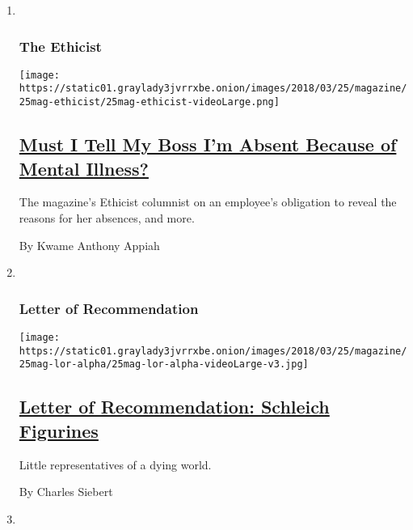 \begin{enumerate}
\def\labelenumi{\arabic{enumi}.}
\item ~
  \hypertarget{the-ethicist}{%
  \subsubsection{The Ethicist}\label{the-ethicist}}

  \texttt{[image: https://static01.graylady3jvrrxbe.onion/images/2018/03/25/magazine/25mag-ethicist/25mag-ethicist-videoLarge.png]}

  \hypertarget{must-i-tell-my-boss-im-absent-because-of-mental-illness}{%
  \subsection{\texorpdfstring{\href{/2018/03/20/magazine/must-i-tell-my-boss-im-absent-because-of-mental-illness.html}{Must
  I Tell My Boss I'm Absent Because of Mental
  Illness?}}{Must I Tell My Boss I'm Absent Because of Mental Illness?}}\label{must-i-tell-my-boss-im-absent-because-of-mental-illness}}

  The magazine's Ethicist columnist on an employee's obligation to
  reveal the reasons for her absences, and more.

  By Kwame Anthony Appiah
\item ~
  \hypertarget{letter-of-recommendation}{%
  \subsubsection{Letter of
  Recommendation}\label{letter-of-recommendation}}

  \texttt{[image: https://static01.graylady3jvrrxbe.onion/images/2018/03/25/magazine/25mag-lor-alpha/25mag-lor-alpha-videoLarge-v3.jpg]}

  \hypertarget{letter-of-recommendation-schleich-figurines}{%
  \subsection{\texorpdfstring{\href{/2018/03/20/magazine/letter-of-recommendation-schleich-figurines.html}{Letter
  of Recommendation: Schleich
  Figurines}}{Letter of Recommendation: Schleich Figurines}}\label{letter-of-recommendation-schleich-figurines}}

  Little representatives of a dying world.

  By Charles Siebert
\item ~
  \hypertarget{talk}{%
}
\end{enumerate}
